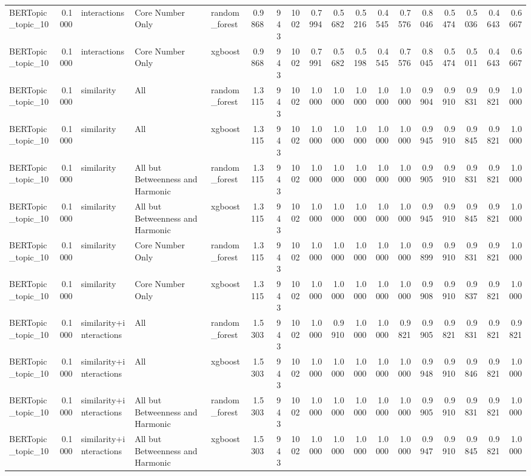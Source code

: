 \begin{tabular}{lrlllrrrrrrrrrrrrr}
BERTopic_topic_10 & 0.1000 & interactions & Core Number Only & random_forest & 0.9868 & 943 & 1002 & 0.7994 & 0.5682 & 0.5216 & 0.4545 & 0.7576 & 0.8046 & 0.5474 & 0.5036 & 0.4643 & 0.6667 \\
BERTopic_topic_10 & 0.1000 & interactions & Core Number Only & xgboost & 0.9868 & 943 & 1002 & 0.7991 & 0.5682 & 0.5198 & 0.4545 & 0.7576 & 0.8045 & 0.5474 & 0.5011 & 0.4643 & 0.6667 \\
BERTopic_topic_10 & 0.1000 & similarity & All & random_forest & 1.3115 & 943 & 1002 & 1.0000 & 1.0000 & 1.0000 & 1.0000 & 1.0000 & 0.9904 & 0.9910 & 0.9831 & 0.9821 & 1.0000 \\
BERTopic_topic_10 & 0.1000 & similarity & All & xgboost & 1.3115 & 943 & 1002 & 1.0000 & 1.0000 & 1.0000 & 1.0000 & 1.0000 & 0.9945 & 0.9910 & 0.9845 & 0.9821 & 1.0000 \\
BERTopic_topic_10 & 0.1000 & similarity & All but Betweenness and Harmonic & random_forest & 1.3115 & 943 & 1002 & 1.0000 & 1.0000 & 1.0000 & 1.0000 & 1.0000 & 0.9905 & 0.9910 & 0.9831 & 0.9821 & 1.0000 \\
BERTopic_topic_10 & 0.1000 & similarity & All but Betweenness and Harmonic & xgboost & 1.3115 & 943 & 1002 & 1.0000 & 1.0000 & 1.0000 & 1.0000 & 1.0000 & 0.9945 & 0.9910 & 0.9845 & 0.9821 & 1.0000 \\
BERTopic_topic_10 & 0.1000 & similarity & Core Number Only & random_forest & 1.3115 & 943 & 1002 & 1.0000 & 1.0000 & 1.0000 & 1.0000 & 1.0000 & 0.9899 & 0.9910 & 0.9831 & 0.9821 & 1.0000 \\
BERTopic_topic_10 & 0.1000 & similarity & Core Number Only & xgboost & 1.3115 & 943 & 1002 & 1.0000 & 1.0000 & 1.0000 & 1.0000 & 1.0000 & 0.9908 & 0.9910 & 0.9837 & 0.9821 & 1.0000 \\
BERTopic_topic_10 & 0.1000 & similarity+interactions & All & random_forest & 1.5303 & 943 & 1002 & 1.0000 & 0.9910 & 1.0000 & 1.0000 & 0.9821 & 0.9905 & 0.9821 & 0.9831 & 0.9821 & 0.9821 \\
BERTopic_topic_10 & 0.1000 & similarity+interactions & All & xgboost & 1.5303 & 943 & 1002 & 1.0000 & 1.0000 & 1.0000 & 1.0000 & 1.0000 & 0.9948 & 0.9910 & 0.9846 & 0.9821 & 1.0000 \\
BERTopic_topic_10 & 0.1000 & similarity+interactions & All but Betweenness and Harmonic & random_forest & 1.5303 & 943 & 1002 & 1.0000 & 1.0000 & 1.0000 & 1.0000 & 1.0000 & 0.9905 & 0.9910 & 0.9831 & 0.9821 & 1.0000 \\
BERTopic_topic_10 & 0.1000 & similarity+interactions & All but Betweenness and Harmonic & xgboost & 1.5303 & 943 & 1002 & 1.0000 & 1.0000 & 1.0000 & 1.0000 & 1.0000 & 0.9947 & 0.9910 & 0.9845 & 0.9821 & 1.0000 \\

\end{tabular}
